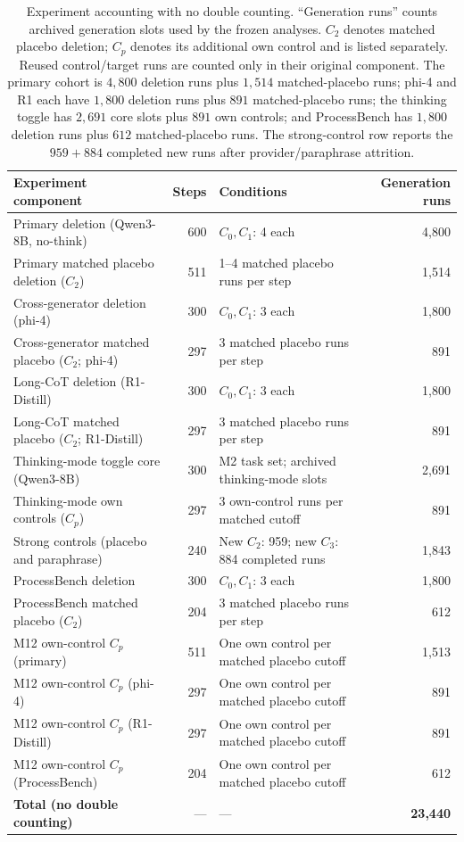 \documentclass[11pt]{article}
\begin{document}
\begin{table}[t]
\centering
\small
\setlength{\tabcolsep}{4pt}
\begin{tabular}{@{}p{}rp{}r@{}}
\toprule
Experiment component & Steps & Conditions & Generation runs \\
\midrule
Primary deletion (Qwen3-8B, no-think)
  & 600 & $C_0,C_1$: 4 each
  & 4{,}800 \\
Primary matched placebo deletion ($C_2$)
  & 511 & 1--4 matched placebo runs per step
  & 1{,}514 \\
Cross-generator deletion (phi-4)
  & 300 & $C_0,C_1$: 3 each
  & 1{,}800 \\
Cross-generator matched placebo ($C_2$; phi-4)
  & 297 & 3 matched placebo runs per step
  & 891 \\
Long-CoT deletion (R1-Distill)
  & 300 & $C_0,C_1$: 3 each
  & 1{,}800 \\
Long-CoT matched placebo ($C_2$; R1-Distill)
  & 297 & 3 matched placebo runs per step
  & 891 \\
Thinking-mode toggle core (Qwen3-8B)
  & 300 & M2 task set; archived thinking-mode slots
  & 2{,}691 \\
Thinking-mode own controls ($C_p$)
  & 297 & 3 own-control runs per matched cutoff
  & 891 \\
Strong controls (placebo and paraphrase)
  & 240 & New $C_2$: 959; new $C_3$: 884 completed runs
  & 1{,}843 \\
ProcessBench deletion
  & 300 & $C_0,C_1$: 3 each
  & 1{,}800 \\
ProcessBench matched placebo ($C_2$)
  & 204 & 3 matched placebo runs per step
  & 612 \\
\midrule
M12 own-control $C_p$ (primary)
  & 511 & One own control per matched placebo cutoff
  & 1{,}513 \\
M12 own-control $C_p$ (phi-4)
  & 297 & One own control per matched placebo cutoff
  & 891 \\
M12 own-control $C_p$ (R1-Distill)
  & 297 & One own control per matched placebo cutoff
  & 891 \\
M12 own-control $C_p$ (ProcessBench)
  & 204 & One own control per matched placebo cutoff
  & 612 \\
\midrule
\textbf{Total (no double counting)} & --- & --- & \textbf{23{,}440} \\
\bottomrule
\end{tabular}
\caption{Experiment accounting with no double counting. ``Generation runs'' counts archived generation slots used by the frozen analyses. $C_2$ denotes matched placebo deletion; $C_p$ denotes its additional own control and is listed separately. Reused control/target runs are counted only in their original component. The primary cohort is $4{,}800$ deletion runs plus $1{,}514$ matched-placebo runs; phi-4 and R1 each have $1{,}800$ deletion runs plus $891$ matched-placebo runs; the thinking toggle has $2{,}691$ core slots plus $891$ own controls; and ProcessBench has $1{,}800$ deletion runs plus $612$ matched-placebo runs. The strong-control row reports the $959+884$ completed new runs after provider/paraphrase attrition.}
\label{tab:generationbudget}
\end{table}
\end{document}
